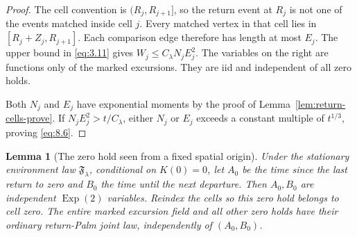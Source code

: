 \documentclass[11pt,reqno]{amsart}
\newtheorem{lemma}[theorem]{Lemma}
\theoremstyle{definition}
\theoremstyle{remark}
\numberwithin{equation}{section}
\newcommand{\cF}{\mathfrak F}
\begin{document}
\begin{proof}
The cell convention is \((R_j,R_{j+1}]\), so the return event at
\(R_j\) is not one of the events matched inside cell \(j\).  Every
matched vertex in that cell lies in
\([R_j+Z_j,R_{j+1}]\).  Each comparison edge therefore has length
at most \(E_j\).  The upper bound in \eqref{eq:3.11} gives
\(W_j\le C_\lambda N_jE_j^2\).  The variables on the right are
functions only of the marked excursions.  They are iid and independent
of all zero holds.

Both \(N_j\) and \(E_j\) have exponential
moments by the proof of Lemma~\ref{lem:return-cells-prove}.  If
\(N_jE_j^2>t/C_\lambda\), either \(N_j\) or \(E_j\) exceeds
a constant multiple of \(t^{1/3}\), proving \eqref{eq:8.6}.
\end{proof}

\begin{lemma}[The zero hold seen from a fixed spatial origin]
\label{lem:stationary-zero-hold}
Under the stationary environment law \(\cF_\lambda\), conditional on
\(K(0)=0\), let \(A_0\) be the time since the last return to zero and
\(B_0\) the time until the next departure.  Then \(A_0,B_0\) are independent
\(\operatorname{Exp}(2)\) variables.  Reindex the cells so this zero hold
belongs to cell zero.  The entire marked excursion field and all other
zero holds have their ordinary return-Palm joint law, independently of
\((A_0,B_0)\).
\end{lemma}
\end{document}
